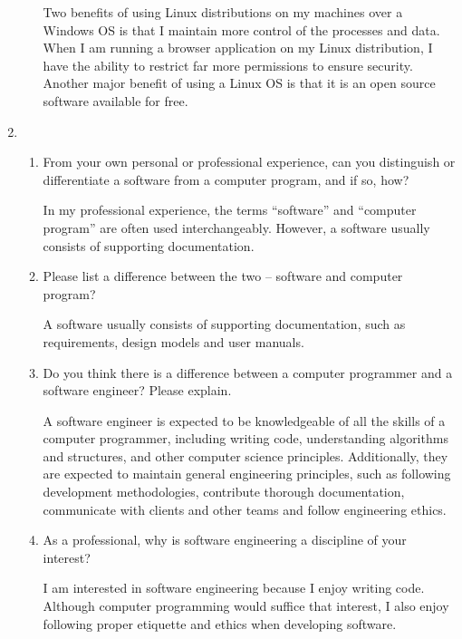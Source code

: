 \documentclass[12pt]{article}
\begin{document}
\begin{enumerate}
\begin{enumerate}[start=1,align=left]
      Two benefits of using Linux distributions on my machines over a Windows OS is that I maintain more control of the processes and data. When I am running a browser application on my Linux distribution, I have the ability to restrict far more permissions to ensure security. Another major benefit of using a Linux OS is that it is an open source software available for free.

    \end{enumerate}

    \item
    \begin{enumerate}[start=1,align=left]
      \item From your own personal or professional experience, can you distinguish or differentiate a software from a computer program, and if so, how?

      In my professional experience, the terms ``software'' and ``computer program'' are often used interchangeably. However, a software usually consists of supporting documentation.

      \item Please list a difference between the two – software and computer program? 

      A software usually consists of supporting documentation, such as requirements, design models and user manuals.

      \item Do you think there is a difference between a computer programmer and a software engineer? Please explain.

      A software engineer is expected to be knowledgeable of all the skills of a computer programmer, including writing code, understanding algorithms and structures, and other computer science principles. Additionally, they are expected to maintain general engineering principles, such as following development methodologies, contribute thorough documentation, communicate with clients and other teams and follow engineering ethics.

      \item As a professional, why is software engineering a discipline of your interest?

      I am interested in software engineering because I enjoy writing code. Although computer programming would suffice that interest, I also enjoy following proper etiquette and ethics when developing software.

    \end{enumerate}


\end{enumerate}
\end{document}
